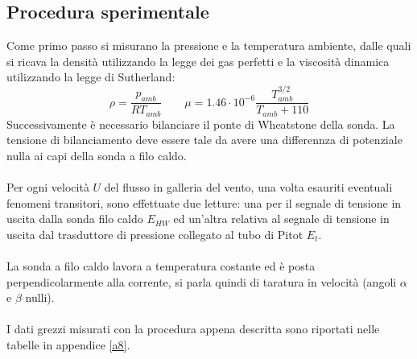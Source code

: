 \newpage
\subsection{Procedura sperimentale}
Come primo passo si misurano la pressione e la temperatura ambiente, dalle quali si ricava la densità utilizzando la legge dei gas perfetti e la viscosità dinamica utilizzando la legge di Sutherland:
\begin{equation*}
    \rho = \frac{p_{amb}}{RT_{amb}} \qquad \mu = 1.46\cdot10^{-6} \frac{T_{amb}^{3/2}}{T_{amb}+110} 
\end{equation*}
Successivamente è necessario bilanciare il ponte di Wheatstone della sonda. La tensione di bilanciamento deve essere tale da avere una differennza di potenziale nulla ai capi della sonda a filo caldo.\\\\
Per ogni velocità $U$ del flusso in galleria del vento, una volta esauriti eventuali fenomeni transitori, sono effettuate due letture: una per il segnale di tensione in uscita dalla sonda filo caldo $E_{HW}$ ed un'altra relativa al segnale di tensione in uscita dal trasduttore di pressione collegato al tubo di Pitot $E_t$.\\\\
La sonda a filo caldo lavora a temperatura costante ed è posta perpendicolarmente alla corrente, si parla quindi di taratura in velocità (angoli $\alpha$ e $\beta$ nulli).\\\\
I dati grezzi misurati con la procedura appena descritta sono riportati nelle tabelle in appendice \ref{a8}.

